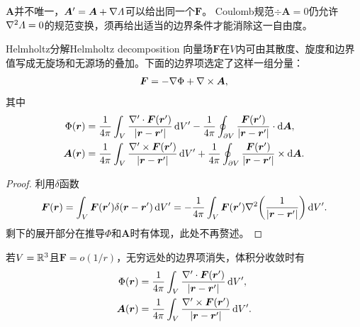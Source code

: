 \begin{remark}
    $\bm A$并不唯一，$\bm A' = \bm A + \nabla\varLambda$可以给出同一个$\bm F$。
    Coulomb规范$\div\bm A = 0$仍允许$\nabla^2\varLambda = 0$的规范变换，须再给出适当的边界条件才能消除这一自由度。
\end{remark}

\begin{theorem}{Helmholtz分解}{Helmholtz decomposition}
    向量场$\bm F$在$V$内可由其散度、旋度和边界值写成无旋场和无源场的叠加。下面的边界项选定了这样一组分量：
    \begin{equation}
        \bm F = -\nabla\Phi + \nabla\times\bm A,
    \end{equation}
    其中
    \begin{subequations}
        \begin{align}
            \Phi(\bm r) &= \frac1{4\pi}\int_V\frac{\nabla' \cdot \bm F(\bm r')}{\lvert\bm r - \bm r'\rvert}\mathop{}\!\mathrm{d} V' - \frac1{4\pi}\oint_{\partial V}\frac{\bm F(\bm r')}{\lvert\bm r - \bm r'\rvert} \cdot \mathop{}\!\mathrm{d}\bm A,\\
            \bm A(\bm r) &= \frac1{4\pi}\int_V\frac{\nabla' \times \bm F(\bm r')}{\lvert\bm r - \bm r'\rvert}\mathop{}\!\mathrm{d} V' + \frac1{4\pi}\oint_{\partial V}\frac{\bm F(\bm r')}{\lvert\bm r - \bm r'\rvert} \times \mathop{}\!\mathrm{d}\bm A.
        \end{align}
    \end{subequations}
\end{theorem}

\begin{proof}
    利用$\delta$函数
    \[
        \bm F(\bm r) = \int_V\bm F(\bm r')\delta(\bm r - \bm r')\mathop{}\!\mathrm{d} V' = -\frac1{4\pi}\int_V\bm F(\bm r')\nabla^2\biggl(\frac1{\lvert\bm r - \bm r'\rvert}\biggr)\mathop{}\!\mathrm{d} V'.
    \]
    剩下的展开部分在推导$\Phi$和$\bm A$时有体现，此处不再赘述。    
\end{proof}

\begin{corollary}
    若$V = \mathbb{R}^3$且$\bm F = o(1/r)$，无穷远处的边界项消失，体积分收敛时有
    \begin{subequations}
        \begin{align}
            \Phi(\bm r) &= \frac1{4\pi}\int_V\frac{\nabla' \cdot \bm F(\bm r')}{\lvert\bm r - \bm r'\rvert}\mathop{}\!\mathrm{d} V',\\
            \bm A(\bm r) &= \frac1{4\pi}\int_V\frac{\nabla' \times \bm F(\bm r')}{\lvert\bm r - \bm r'\rvert}\mathop{}\!\mathrm{d} V'.
        \end{align}
    \end{subequations}
\end{corollary}

